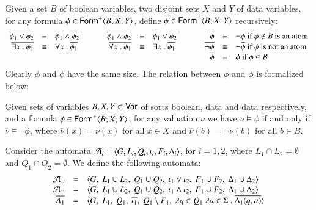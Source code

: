 \documentclass{llncs}
\begin{document}
Given a set $B$ of boolean variables, two disjoint sets $X$ and $Y$ of
data variables, for any formula $\phi \in \mathsf{Form}^+\langle B;X;Y \rangle$,
define $\overline{\phi} \in \mathsf{Form}^+\langle B;X;Y \rangle$ recursively:
\[\begin{array}{rclcrclcrcl}
\overline{\phi_1 \vee \phi_2} & \equiv & \overline{\phi_1} \wedge \overline{\phi_2} & \hspace*{5mm} & 
\overline{\phi_1 \wedge \phi_2} & \equiv & \overline{\phi_1} \vee \overline{\phi_2} & \hspace*{5mm} & 
\overline{\phi} & \equiv & \neg\phi \text{ if $\phi \not\in B$ is an atom} \\ 
\overline{\exists x ~.~ \phi_1} & \equiv & \forall x ~.~ \overline{\phi_1} && 
\overline{\forall x ~.~ \phi_1} & \equiv & \exists x ~.~ \overline{\phi_1} && 
\overline{\neg\phi} & \equiv & \neg \overline{\phi} \text{ if $\phi$ is not an atom} \\
&& && && && \overline{\phi} & \equiv & \phi \text{ if $\phi \in B$}
\end{array}\]
Clearly $\phi$ and $\overline{\phi}$ have the same size. The relation
between $\phi$ and $\overline{\phi}$ is formalized below:

\begin{proposition}\label{prop:complement}
  Given sets of variables $B,X,Y \subset \mathsf{Var}$ of sorts boolean, data
  and data respectively, and a formula $\phi \in
  \mathsf{Form}^+\langle B;X;Y \rangle$, for any valuation $\nu$ we have $\nu \models
  \phi$ if and only if $\overline{\nu} \models \neg\overline{\phi}$,
  where $\overline{\nu}(x) = \nu(x)$ for all $x \in X$ and
  $\overline{\nu}(b) = \neg\nu(b)$ for all $b \in B$.
\end{proposition}

Consider the automata $\mathcal{A}_i = \langle G,L_i,Q_i,\iota_i,F_i,\Delta_i \rangle$,
for $i=1,2$, where $L_1 \cap L_2 = \emptyset$ and $Q_1 \cap Q_2 =
\emptyset$. We define the following automata: 
\[\begin{array}{rcl}
\mathcal{A}_\cup & = & \langle G,~ L_1 \cup L_2,~ Q_1 \cup Q_2,~ \iota_1 \vee \iota_2,~ F_1 \cup F_2,~ \Delta_1 \cup \Delta_2 \rangle \\
\mathcal{A}_\cap & = & \langle G,~ L_1 \cup L_2,~ Q_1 \cup Q_2,~ \iota_1 \wedge \iota_2,~ F_1 \cup F_2,~ \Delta_1 \cup \Delta_2 \rangle \\
\overline{A_1} & = & \langle G,~ L_1,~ Q_1,~ \overline{\iota_1},~ Q_1 \setminus F_1,~ \lambda q \in Q_1~ \lambda a \in \Sigma ~.~ \overline{\Delta_1(q,a)} \rangle
\end{array}\]
\end{document}
